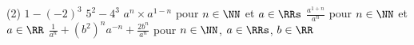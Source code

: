 %
%
	\begin{tasks}(2)
		\task $1-(-2)^3$
		\task $5^2-4^3$
		\task $a^n\times a^{1-n}$ pour $n\in \NN$ et $a \in \RRs$
		\task $\frac{a^{1+n}}{a^n}$ pour $n\in \NN$ et  $a \in \RR$
		\task $\frac{1}{a^n}+ (b^2)^n a^{-n}+\frac{2b^n}{a^n}$ pour $n\in \NN$, $a \in \RRs$, $b\in \RR$
	\end{tasks}
